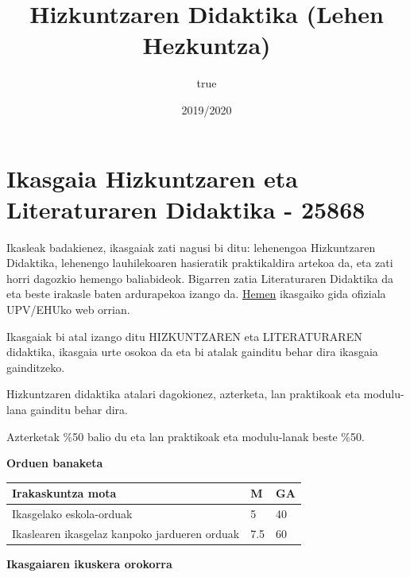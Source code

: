 \documentclass[]{book}
\title{Hizkuntzaren Didaktika (Lehen Hezkuntza)}
\author{true}
\date{2019/2020}
\begin{document}
\maketitle

{
\setcounter{tocdepth}{1}
\tableofcontents
}
\hypertarget{ikasgaia-hizkuntzaren-eta-literaturaren-didaktika---25868}{%
\chapter*{Ikasgaia Hizkuntzaren eta Literaturaren Didaktika - 25868}\label{ikasgaia-hizkuntzaren-eta-literaturaren-didaktika---25868}}

Ikasleak badakienez, ikasgaiak zati nagusi bi ditu: lehenengoa Hizkuntzaren Didaktika, lehenengo lauhilekoaren hasieratik praktikaldira artekoa da, eta zati horri dagozkio hemengo baliabideok. Bigarren zatia Literaturaren Didaktika da eta beste irakasle baten ardurapekoa izango da. \href{https://www.ehu.eus/eu/lehen-hezkuntzako-gradua-bizkaia/kreditu-eta-irakasgaiak?p_redirect=consultaAsignatura\&p_cod_proceso=egr\&p_anyo_acad=20180\&p_ciclo=X\&p_curso=3\&p_cod_asignatura=25868}{Hemen} ikasgaiko gida ofiziala UPV/EHUko web orrian.

Ikasgaiak bi atal izango ditu HIZKUNTZAREN eta LITERATURAREN didaktika, ikasgaia urte osokoa da eta bi atalak gainditu behar dira ikasgaia gainditzeko.

Hizkuntzaren didaktika atalari dagokionez, azterketa, lan praktikoak eta modulu-lana gainditu behar dira.

Azterketak \%50 balio du eta lan praktikoak eta modulu-lanak beste \%50.

\textbf{Orduen banaketa}

\begin{longtable}[]{@{}lll@{}}
\toprule
Irakaskuntza mota & M & GA\tabularnewline
\midrule
\endhead
Ikasgelako eskola-orduak & 5 & 40\tabularnewline
Ikaslearen ikasgelaz kanpoko jardueren orduak & 7.5 & 60\tabularnewline
\bottomrule
\end{longtable}

\textbf{Ikasgaiaren ikuskera orokorra}
\end{document}
